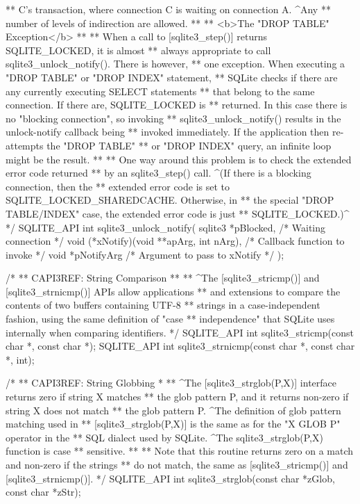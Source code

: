 \begin{Codex}[label=sqlite3.h,numbers=left]
{** C's transaction, where connection C is waiting on connection A. ^Any
** number of levels of indirection are allowed.
**
** <b>The "DROP TABLE" Exception</b>
**
** When a call to [sqlite3_step()] returns SQLITE_LOCKED, it is almost 
** always appropriate to call sqlite3_unlock_notify(). There is however,
** one exception. When executing a "DROP TABLE" or "DROP INDEX" statement,
** SQLite checks if there are any currently executing SELECT statements
** that belong to the same connection. If there are, SQLITE_LOCKED is
** returned. In this case there is no "blocking connection", so invoking
** sqlite3_unlock_notify() results in the unlock-notify callback being
** invoked immediately. If the application then re-attempts the "DROP TABLE"
** or "DROP INDEX" query, an infinite loop might be the result.
**
** One way around this problem is to check the extended error code returned
** by an sqlite3_step() call. ^(If there is a blocking connection, then the
** extended error code is set to SQLITE_LOCKED_SHAREDCACHE. Otherwise, in
** the special "DROP TABLE/INDEX" case, the extended error code is just 
** SQLITE_LOCKED.)^
*/
SQLITE_API int sqlite3_unlock_notify(
  sqlite3 *pBlocked,                          /* Waiting connection */
  void (*xNotify)(void **apArg, int nArg),    /* Callback function to invoke */
  void *pNotifyArg                            /* Argument to pass to xNotify */
);


/*
** CAPI3REF: String Comparison
**
** ^The [sqlite3_stricmp()] and [sqlite3_strnicmp()] APIs allow applications
** and extensions to compare the contents of two buffers containing UTF-8
** strings in a case-independent fashion, using the same definition of "case
** independence" that SQLite uses internally when comparing identifiers.
*/
SQLITE_API int sqlite3_stricmp(const char *, const char *);
SQLITE_API int sqlite3_strnicmp(const char *, const char *, int);

/*
** CAPI3REF: String Globbing
*
** ^The [sqlite3_strglob(P,X)] interface returns zero if string X matches
** the glob pattern P, and it returns non-zero if string X does not match
** the glob pattern P.  ^The definition of glob pattern matching used in
** [sqlite3_strglob(P,X)] is the same as for the "X GLOB P" operator in the
** SQL dialect used by SQLite.  ^The sqlite3_strglob(P,X) function is case
** sensitive.
**
** Note that this routine returns zero on a match and non-zero if the strings
** do not match, the same as [sqlite3_stricmp()] and [sqlite3_strnicmp()].
*/
SQLITE_API int sqlite3_strglob(const char *zGlob, const char *zStr);

}
\end{Codex}
